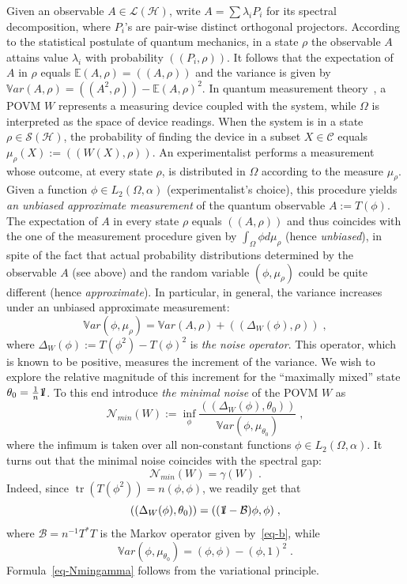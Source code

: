 \documentclass[11pt]{article}
\theoremstyle{definition}
\numberwithin{equation}{section}
\numberwithin{figure}{section}
\numberwithin{table}{section}
\DeclareMathOperator{\tr}{tr}
\newcommand{\cB}{{\mathcal{B}}}
\newcommand{\cN}{{\mathcal{N}}}
\newcommand{\cS}{{\mathcal{S}}}
\newcommand*\id{{1\hskip-2.5pt{\rm l}}}
\newcommand{\Hilb}{\mathcal{H}}
\newcommand\< {\mathcal{h}}
\renewcommand\> {\mathcal{i}}
\newcommand*\cC{\mathscr{C}}
\newcommand*\cL{\mathscr{L}}
\begin{document}
Given an observable $A \in \cL(\Hilb)$, write $A= \sum \lambda_iP_i$ for its spectral decomposition, where $P_i$'s are pair-wise distinct orthogonal projectors. According to the statistical postulate of quantum mechanics, in a state $\rho$ the observable $A$ attains value $\lambda_i$ with probability $((P_i,\rho))$. It follows that the expectation of $A$ in $\rho$ equals $\mathbb{E}(A,\rho)= ((A,\rho))$ and the variance is given by $\mathbb{V}ar(A,\rho) = ((A^2,\rho)) - \mathbb{E}(A,\rho)^2$. In quantum measurement theory~\cite{Busch-2}, a POVM $W$ represents a measuring device coupled with the system, while $\Omega$ is interpreted as the space of device readings. When the system is in a state $\rho \in \cS(\Hilb)$, the probability of finding the device in a subset $X \in \cC$ equals $\mu_{\rho}(X):= ((W(X),\rho))$. An experimentalist performs a measurement whose outcome, at every state $\rho$, is distributed in $\Omega$ according to the measure $\mu_{\rho}$. Given a function $\phi \in L_2(\Omega,\alpha)$ (experimentalist's choice), this procedure yields \emph{an unbiased approximate measurement} of the quantum observable $A:=T(\phi)$. The expectation of $A$ in every state $\rho$ equals $((A,\rho))$ and thus coincides with the one of the measurement procedure given by $\int_\Omega \phi d\mu_\rho$ (hence \emph{unbiased}), in spite of the fact that actual probability distributions determined by the observable $A$ (see above) and the random variable $(\phi,\mu_{\rho})$ could be quite different (hence \emph{approximate}). In particular, in general, the variance increases under an unbiased approximate measurement:
\begin{equation}\label{eq-noise}
\mathbb{V}ar(\phi,\mu_{\rho}) = \mathbb{V}ar(A,\rho) + ((\Delta_W(\phi),\rho))\;,
\end{equation}
where $\Delta_W(\phi):= T(\phi^2)-T(\phi)^2 $ is \emph{the noise operator}. This operator, which is known to be positive, measures the increment of the variance. We wish to explore the relative magnitude of this increment for the ``maximally mixed'' state
$\theta_0= \frac{1}{n}\id$. To this end introduce \emph{the minimal noise} of the POVM $W$ as
\[
\cN_{min}(W):= \inf_{\phi} \frac{((\Delta_W(\phi),\theta_0))}{\mathbb{V}ar(\phi,\mu_{\theta_0}) }\;,
\]
where the infimum is taken over all non-constant functions $\phi \in L_2(\Omega,\alpha)$. It turns out that the minimal noise coincides with the spectral gap:
\begin{equation}\label{eq-Nmingamma}
\cN_{min}(W) = \gamma(W)\;.
\end{equation}
Indeed, since $\tr(T(\phi^2))= n(\phi,\phi)$, we readily get that
\[
((\Delta_W(\phi),\theta_0))= ((\id- \cB)\phi,\phi)\;,
\]
where $\cB= n^{-1}T^*T$ is the Markov operator given by~\eqref{eq-b},
while
\[
\mathbb{V}ar(\phi,\mu_{\theta_0})= (\phi,\phi) - (\phi,1)^2\;.
\]
Formula~\eqref{eq-Nmingamma} follows from the variational principle.
\end{document}
